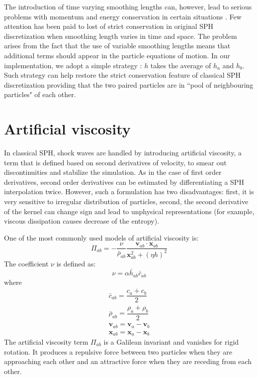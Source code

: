 The introduction of time varying smoothing lengths can, however, lead to serious problems with momentum and energy conservation in certain situations \citep{hernquist1993some}. Few attention has been paid to lost of strict conservation in original SPH discretization when smoothing length varies in time and space. The problem arises from the fact that the use of variable smoothing lengths means that additional terms \citep{nelson1994variable} should appear in the particle equations of motion. In our implementation, we adopt a simple strategy \citep{evrard1988beyond}: $h$ takes the average of $h_a$ and $h_b$. Such strategy can help restore the strict conservation feature of classical SPH discretization providing that the two paired particles are in ``pool of neighbouring particles" of each other. 

\section{Artificial viscosity} \label{sec:artificial-viscosity}
In classical SPH, shock waves are handled by introducing artificial viscosity, a term that is defined based on second derivatives of velocity, to smear out discontinuities and stabilize the simulation. As in the case of first order derivatives, second order derivatives can be estimated by differentiating a SPH interpolation twice. However, such a formulation has two disadvantages: first, it is very sensitive to irregular distribution of particles, second, the second derivative of the kernel can change sign and lead to unphysical representations (for example, viscous dissipation causes decrease of the entropy). 

One of the most commonly used models of artificial viscosity \citep{monaghan1983shock} is:
\begin{equation}
\Pi_{ab}=- \frac{\nu}{\bar{\rho}_{ab}} \dfrac{ \textbf{v}_{ab} \cdot \textbf{x}_{ab}}{\textbf{x}_{ab}^2 + \left(\eta h\right)^2}
\label{eq:art-vis-original}
\end{equation}
The coefficient $\nu$ is defined as:
\begin{equation}
\nu = \alpha \bar{h}_{ab} \bar{c}_{ab}
\end{equation}
where 
\begin{align}
\bar{c}_{ab} = \dfrac{c_a + c_b}{2} \\
\bar{\rho}_{ab} = \dfrac{\rho_a + \rho_b}{2} \\
\textbf{v}_{ab}=\textbf{v}_a-\textbf{v}_b \\
\textbf{x}_{ab}=\textbf{x}_a-\textbf{x}_b
\end{align}
The artificial viscosity term $\Pi_{ab}$ is a Galilean invariant and vanishes for rigid rotation. It produces a repulsive force between two particles when they are approaching each other and an attractive force when they are receding from each other. 


